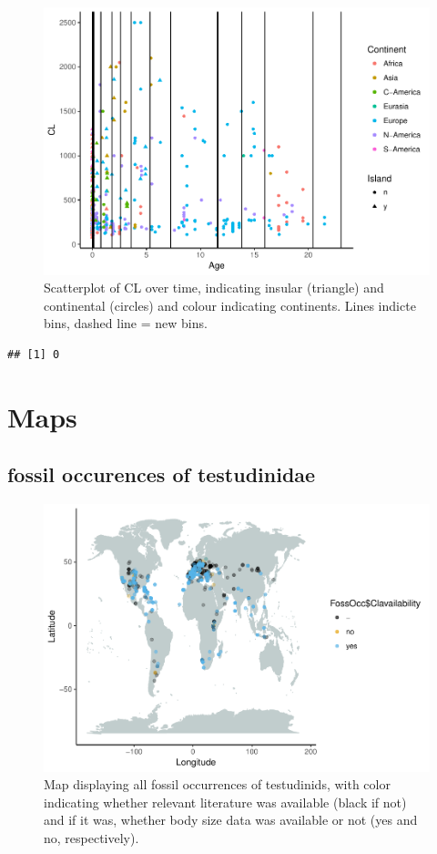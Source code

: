 \documentclass[]{article}
\begin{document}
\begin{figure}[htbp]
\centering
\includegraphics{MA_JJ_files/figure-latex/Get overview over data set-1.pdf}
\caption{Scatterplot of CL over time, indicating insular (triangle) and
continental (circles) and colour indicating continents. Lines indicte
bins, dashed line = new bins.}
\end{figure}

\begin{verbatim}
## [1] 0
\end{verbatim}

\newpage

\section{Maps}\label{maps}

\subsection{fossil occurences of
testudinidae}\label{fossil-occurences-of-testudinidae}

\begin{figure}[htbp]
\centering
\includegraphics{MA_JJ_files/figure-latex/Map fossil occurrences-1.pdf}
\caption{Map displaying all fossil occurrences of testudinids, with
color indicating whether relevant literature was available (black if
not) and if it was, whether body size data was available or not (yes and
no, respectively).}
\end{figure}
\end{document}
